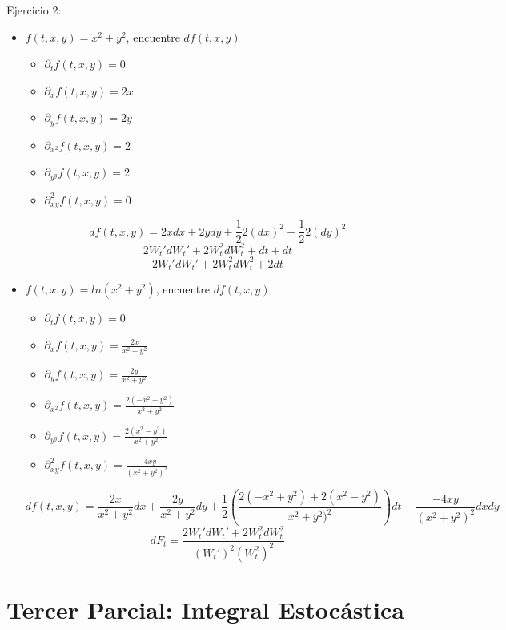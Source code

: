 \documentclass[11pt,fleqn]{book} %
\numberwithin{equation}{section} %
\numberwithin{figure}{section} %
\numberwithin{table}{section} %
\begin{document}
Ejercicio 2:
\begin{itemize}
    \item $f(t,x,y) = x^{2} + y^{2} $, encuentre $df(t,x,y)$
    \begin{itemize}
        \item $\partial_{t} f(t,x,y)= 0 $
        \item $\partial_{x} f(t,x,y)= 2x $
        \item $\partial_{y} f(t,x,y)= 2y $
        \item $\partial_{x^{2}} f(t,x,y)= 2 $
        \item $\partial_{y^{y}} f(t,x,y)= 2 $
        \item $\partial_{xy}^{2} f(t,x,y)= 0 $
    \end{itemize}
    $$ df(t,x,y) = 2xdx + 2ydy + \frac{1}{2}2(dx)^{2} + \frac{1}{2}2(dy)^{2}  $$
    $$  2W_{t}'dW_{t}' + 2W_{t}^{2}dW_{t}^{2} + dt + dt  $$  
    $$  2W_{t}'dW_{t}' + 2W_{t}^{2}dW_{t}^{2} + 2dt  $$
    \item $f(t,x,y) = ln(x^{2} + y^{2}) $, encuentre $df(t,x,y)$
    \begin{itemize}
        \item $\partial_{t} f(t,x,y)= 0 $
        \item $\partial_{x} f(t,x,y)= \frac{2x}{x^{2} + y^{2}} $
        \item $\partial_{y} f(t,x,y)= \frac{2y}{x^{2} + y^{2}}  $
        \item $\partial_{x^{2}} f(t,x,y)= \frac{2(-x^{2} + y^{2})}{x^{2} + y^{2}} $
        \item $\partial_{y^{y}} f(t,x,y)= \frac{2(x^{2} - y^{2})}{x^{2} + y^{2}} $
        \item $\partial_{xy}^{2} f(t,x,y)= \frac{-4xy}{(x^{2} + y^{2})^{2}} $
    \end{itemize}
    $$ df(t,x,y) = \frac{2x}{x^{2} + y^{2}} dx + \frac{2y}{x^{2} + y^{2}} dy + \frac{1}{2} (\frac{2(-x^{2} + y^{2}) + 2(x^{2} - y^{2})}{x^{2} + y^{2})^{2}}) dt - \frac{-4xy}{(x^{2} + y^{2})^{2}} dxdy $$
    $$  dF_{t} = \frac{2W_{t}'dW_{t}' + 2W_{t}^{2}dW_{t}^{2}}{(W_{t}')^{2}(W_{t}^{2})^{2}}    $$
\end{itemize}

\chapterimage{} %
\chapter{Tercer Parcial: Integral Estocástica}
\end{document}

